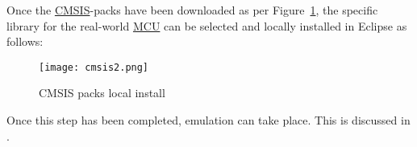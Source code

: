 Once the \hyperref[listAbr]{CMSIS}-packs have been downloaded as per Figure~\ref{CMSIS1}, the specific library for the real-world \hyperref[listAbr]{MCU} can be selected and locally installed in Eclipse as follows:

\begin{figure}[H]
\begin{center}
\texttt{[image: cmsis2.png]}
\caption{CMSIS packs local install}
\label{CMSIS1}
\end{center}
\end{figure}

Once this step has been completed, emulation can take place. This is discussed in \textbf{}. 










